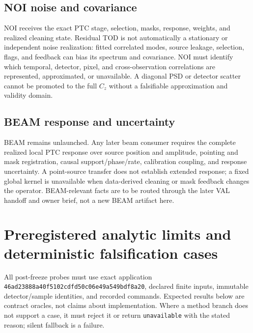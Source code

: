 \documentclass[11pt]{article}
\newcommand{\appsha}{\texttt{46ad23888a40f5102cdfd50c06e49a549bdf8a20}}
\newcommand{\unknown}{\texttt{unavailable}}
\begin{document}
\subsection{NOI noise and covariance}

NOI receives the exact PTC stage, selection, masks, response, weights, and
realized cleaning state.  Residual TOD is not automatically a stationary or
independent noise realization: fitted correlated modes, source leakage,
selection, flags, and feedback can bias its spectrum and covariance.  NOI
must identify which temporal, detector, pixel, and cross-observation
correlations are represented, approximated, or unavailable.  A diagonal PSD
or detector scatter cannot be promoted to the full $C_z$ without a falsifiable
approximation and validity domain.

\subsection{BEAM response and uncertainty}

BEAM remains unlaunched.  Any later beam consumer requires the complete
realized local PTC response over source position and amplitude, pointing and
mask registration, causal support/phase/rate, calibration coupling, and
response uncertainty.  A point-source transfer does not establish extended
response; a fixed global kernel is unavailable when data-derived cleaning or
mask feedback changes the operator.  BEAM-relevant facts are to be routed
through the later VAL handoff and owner brief, not a new BEAM artifact here.

\section{Preregistered analytic limits and deterministic falsification cases}
\label{sec:falsification}

All post-freeze probes must use exact application \appsha, declared finite
inputs, immutable detector/sample identities, and recorded commands.  Expected
results below are contract oracles, not claims about implementation.  Where a
method branch does not support a case, it must reject it or return
\unknown{} with the stated reason; silent fallback is a failure.
\end{document}
